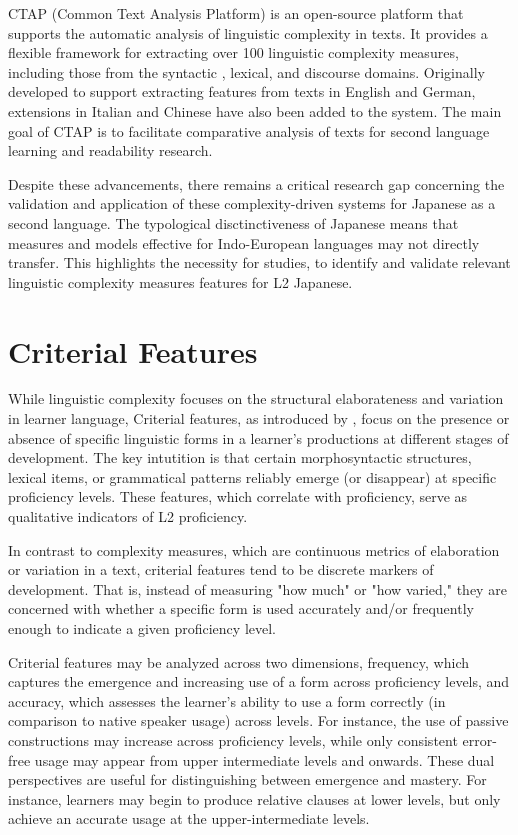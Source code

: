 CTAP (Common Text Analysis Platform) \citep{ctap} is an open-source platform that supports the automatic
analysis of linguistic complexity in texts.  It provides a flexible framework for extracting over 100 linguistic
complexity measures, including those from the syntactic , lexical,
and
discourse domains. Originally developed to support extracting features from texts in English and German,
extensions in Italian \citep{ctap-italian} and Chinese \citep{ctap-chinese} have also been added to the system. The
main goal of CTAP is to facilitate comparative analysis of texts for second language learning
and readability research.

Despite these advancements, there remains a critical research gap concerning the validation and application of these
complexity-driven systems for Japanese as a second language. The typological disctinctiveness of Japanese means that
measures and models effective for Indo-European languages may not directly transfer. This highlights the necessity
for studies, to identify and validate relevant linguistic complexity measures
features for L2 Japanese.


\section{Criterial Features}

While linguistic complexity focuses on the structural elaborateness and variation in learner language, Criterial
features, as introduced
    by \citet{Hawkins_Buttery_2010}, focus on the
    presence or
    absence of specific linguistic forms in a learner's
    productions at different
    stages of development. The key intutition is that certain morphosyntactic structures, lexical items, or
grammatical patterns reliably emerge (or disappear) at specific proficiency levels. These features, which correlate
with proficiency, serve as qualitative indicators of L2 proficiency.

In contrast to complexity measures, which are continuous metrics of
elaboration
or variation in a text, criterial features tend to be discrete markers of development. That is, instead of measuring
"how much" or "how varied," they are concerned with whether a specific form is used accurately and/or frequently
enough to
indicate a given proficiency level.

Criterial features may be analyzed across two dimensions, frequency, which captures the emergence and increasing use
of a form across proficiency levels, and accuracy, which assesses the learner's ability to use a form correctly (in
comparison
to native speaker usage) across levels. For instance, the use of passive
constructions may increase across proficiency levels, while only consistent error-free usage may appear from upper
intermediate levels and onwards. These dual perspectives are useful for distinguishing between emergence and mastery. For instance, learners may
begin to produce relative clauses at lower levels, but only achieve an accurate usage at the upper-intermediate
levels.

